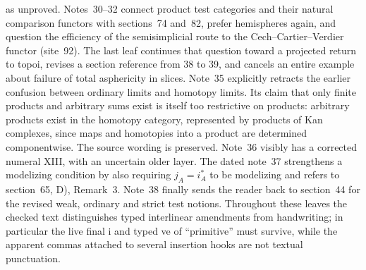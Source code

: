 \documentclass[10pt,oneside]{book}
\begin{document}
as unproved. Notes~30--32 connect product test categories and their natural comparison functors with sections~74 and~82, prefer hemispheres again, and question the efficiency of the semisimplicial route to the Cech--Cartier--Verdier functor (site~92). The last leaf continues that question toward a projected return to topoi, revises a section reference from 38 to 39, and cancels an entire example about failure of total asphericity in slices. Note~35 explicitly retracts the earlier confusion between ordinary limits and homotopy limits. Its claim that only finite products and arbitrary sums exist is itself too restrictive on products: arbitrary products exist in the homotopy category, represented by products of Kan complexes, since maps and homotopies into a product are determined componentwise. The source wording is preserved. Note~36 visibly has a corrected numeral XIII, with an uncertain older layer. The dated note~37 strengthens a modelizing condition by also requiring $j_A=i_A^*$ to be modelizing and refers to section~65, D), Remark~3. Note~38 finally sends the reader back to section~44 for the revised weak, ordinary and strict test notions. Throughout these leaves the checked text distinguishes typed interlinear amendments from handwriting; in particular the live final i and typed ve of ``primitive'' must survive, while the apparent commas attached to several insertion hooks are not textual punctuation.
\end{document}
